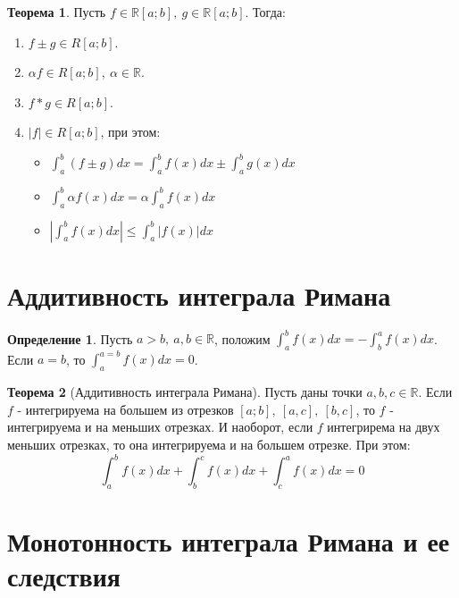 \documentclass{report}
\theoremstyle{definition}
\newtheorem*{definition}{Определение}
\newtheorem*{theorem}{Теорема}
\begin{document}
\begin{theorem}
    Пусть $f\in\mathbb{R}[a;b], \ g\in\mathbb{R}[a;b]$. Тогда:
    \begin{enumerate}
        \item $f\pm g \in R[a;b]$.
        \item $\alpha f \in R[a;b], \ \alpha \in \mathbb{R}$.
        \item $f*g\in R[a;b]$.
        \item $|f|\in R[a;b]$, при этом:
              \begin{itemize}
                  \item $\int_{a}^{b}(f\pm g)dx = \int_{a}^{b}f(x)dx \pm \int_{a}^{b}g(x)dx$
                  \item $\int_{a}^{b}\alpha f(x)dx = \alpha \int_{a}^{b}f(x)dx$
                  \item $|\int_{a}^{b}f(x)dx | \leqslant \int_{a}^{b}|f(x)|dx$
              \end{itemize}
    \end{enumerate}
\end{theorem}

\section{Аддитивность интеграла Римана}

\begin{definition}
    Пусть $a>b, \ a,b\in\mathbb{R}$, положим $\int_{a}^{b}f(x)dx = -\int_{b}^{a}f(x)dx$. Если $a=b$, то
    $\int_{a}^{a=b}f(x)dx =0$.
\end{definition}

\begin{theorem}[Аддитивность интеграла Римана]
    Пусть даны точки $a,b,c\in \mathbb{R}$. Если $f$ - интегрируема на большем из отрезков $[a;b],\ [a,c],\
        [b,c]$, то $f$ - интегрируема и на меньших отрезках. И наоборот, если $f$ интегрирема на двух меньших отрезках,
    то она интегрируема и на большем отрезке. При этом:
    \begin{equation*}
        \int_{a}^{b}f(x) dx + \int_{b}^{c}f(x)dx + \int_{c}^{a}f(x)dx = 0
    \end{equation*}
\end{theorem}

\section{Монотонность интеграла Римана и ее следствия}
\end{document}
